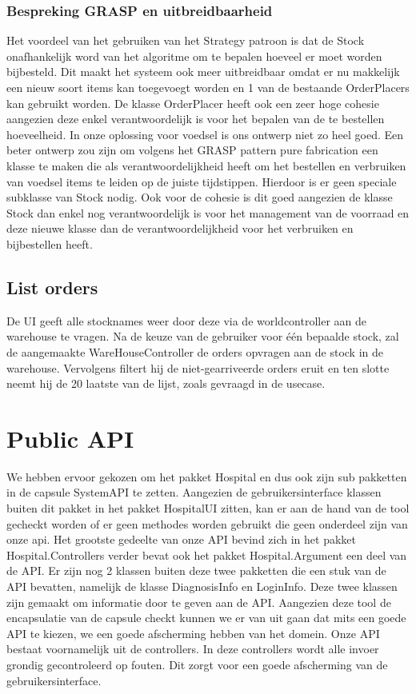 \documentclass[a4paper]{article}
\begin{document}
\subsubsection{Bespreking GRASP en uitbreidbaarheid}
Het voordeel van het gebruiken van het Strategy patroon is dat de Stock onafhankelijk word van het algoritme om te bepalen hoeveel er moet worden bijbesteld. Dit maakt het systeem ook meer uitbreidbaar omdat er nu makkelijk een nieuw soort items kan toegevoegt worden en 1 van de bestaande OrderPlacers kan gebruikt worden. De klasse OrderPlacer heeft ook een zeer hoge cohesie aangezien deze enkel verantwoordelijk is voor het bepalen van de te bestellen hoeveelheid. In onze oplossing voor voedsel is ons ontwerp niet zo heel goed. Een beter ontwerp zou zijn om volgens het GRASP pattern pure fabrication een klasse te maken die als verantwoordelijkheid heeft om het bestellen en verbruiken van voedsel items te leiden op de juiste tijdstippen. Hierdoor is er geen speciale subklasse van Stock nodig. Ook voor de cohesie is dit goed aangezien de klasse Stock dan enkel nog verantwoordelijk is voor het management van de voorraad en deze nieuwe klasse dan de verantwoordelijkheid voor het verbruiken en bijbestellen heeft.

\subsection{List orders}
De UI geeft alle stocknames weer door deze via de worldcontroller aan de warehouse te vragen. Na de keuze van de gebruiker voor \'e\'en bepaalde stock, zal de aangemaakte WareHouseController de orders opvragen aan de stock in de warehouse. Vervolgens filtert hij de niet-gearriveerde orders eruit en ten slotte neemt hij de 20 laatste van de lijst, zoals gevraagd in de usecase.

\section{Public API}

We hebben ervoor gekozen om het pakket Hospital en dus ook zijn sub pakketten in de capsule SystemAPI te zetten. Aangezien de gebruikersinterface klassen buiten dit pakket in het pakket HospitalUI zitten, kan er aan de hand van de tool gecheckt worden of er geen methodes worden gebruikt die geen onderdeel zijn van onze api. Het grootste gedeelte van onze API bevind zich in het pakket Hospital.Controllers verder bevat ook het pakket Hospital.Argument een deel van de API. Er zijn nog 2 klassen buiten deze twee pakketten die een stuk van de API bevatten, namelijk de klasse DiagnosisInfo en LoginInfo. Deze twee klassen zijn gemaakt om informatie door te geven aan de API. Aangezien deze tool de encapsulatie van de capsule checkt kunnen we er van uit gaan dat mits een goede API te kiezen, we een goede afscherming hebben van het domein. Onze API bestaat voornamelijk uit de controllers. In deze controllers wordt alle invoer grondig gecontroleerd op fouten. Dit zorgt voor een goede afscherming van de gebruikersinterface.
\end{document}

